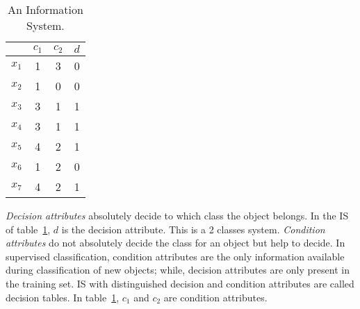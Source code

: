 \documentclass[authoryear,11pt]{elsarticle}
\begin{document}
  
 \begin{table}[htb]
		\caption{An Information System.} \label{tab_IS}
		\centering
 	\begin{tabular}{c||c|c||c}
 			  & $c_1$ & $c_2$ &  $d$ \\
 		\hline \hline
		$x_1$ &   1   &    3  &   0   \\
		$x_2$ &   1   &    0  &   0   \\
		$x_3$ &   3   &    1  &   1   \\
		$x_4$ &   3   &    1  &   1   \\
		$x_5$ &   4   &    2  &   1   \\
		$x_6$ &   1   &    2  &   0   \\
		$x_7$ &   4   &    2  &   1   \\
 	\end{tabular}             
 \end{table}
 
   
  \textit{Decision attributes} absolutely decide to which class the object belongs. In the IS of
  table~\ref{tab_IS}, $d$ is the decision attribute. 
  This is a 2 classes system. \textit{Condition attributes} do not absolutely decide the class for 
  an object but help to decide. In supervised classification, condition attributes are the only information
  available during classification of new objects; while, decision attributes are only present in the training set. 
  IS with distinguished decision and condition attributes are called decision tables. In table~\ref{tab_IS},
  $c_1$ and $c_2$ are condition attributes.
 
\end{document}
